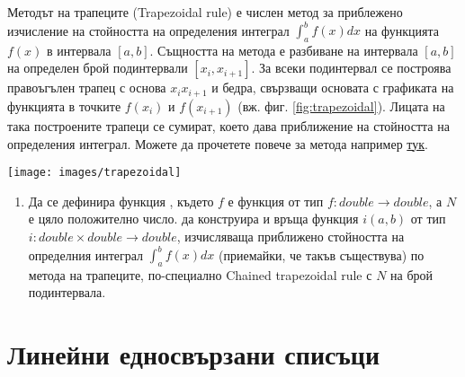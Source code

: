\begin{mdframed}[hidealllines=true,backgroundcolor=gray!20]
  Методът на трапеците\cite{trapezoidal} (Trapezoidal rule) е числен метод за приблежено изчисление на стойността на определения интеграл $\int_{a}^{b} f(x) dx$ на функцията $f(x)$ в интервала $[a,b]$. Същността на метода е разбиване на интервала $[a,b]$ на определен брой подинтервали $[x_i,x_{i+1}]$. За всеки подинтервал се построява правоъгълен трапец с основа $x_i x_{i+1}$ и бедра, свързващи основата с графиката на функцията в точките $f(x_i)$ и $f(x_{i+1})$ (вж. фиг. \ref{fig:trapezoidal}). Лицата на така построените трапеци се сумират, което дава приближение на стойността на определения интеграл. Можете да прочетете повече за метода например \href{https://en.wikipedia.org/wiki/Trapezoidal_rule}{тук}\cite{trapezoidal}.

  {\centering
  \texttt{[image: images/trapezoidal]}
  \label{fig:trapezoidal}
  \par}

    

\end{mdframed}  

\begin{enumerate}[resume]

  \item Да се дефинира функция , където $f$ е функция от тип $f:double \rightarrow double$, а $N$ е цяло положително число.  да конструира и връща функция $i(a,b)$ от тип $i:double \times double \rightarrow double$, изчисляваща приближено стойността на определния интеграл $\int_{a}^{b} f(x) dx$ (приемайки, че такъв съществува) по метода на трапеците, по-специално Chained trapezoidal rule\cite{trapezoidal} с $N$ на брой подинтервала.
\end{enumerate}

\pagebreak

\clearpage\section{\label{sect:llists}Линейни едносвързани списъци}

